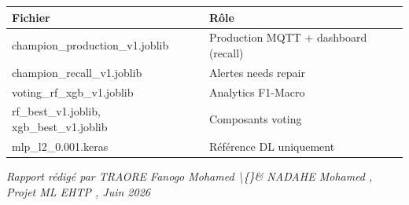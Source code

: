 \documentclass[11pt,a4paper]{report}
\begin{document}
{\small
\begin{longtable}{@{}>{\raggedright\arraybackslash}p{}>{\raggedright\arraybackslash}p{}@{}}
\toprule
\rowcolor{EHTPTableHead}Fichier & Rôle \\
\midrule
champion\_production\_v1.joblib & Production MQTT + dashboard (recall) \\
champion\_recall\_v1.joblib & Alertes needs repair \\
voting\_rf\_xgb\_v1.joblib & Analytics F1-Macro \\
rf\_best\_v1.joblib, xgb\_best\_v1.joblib & Composants voting \\
mlp\_l2\_0.001.keras & Référence DL uniquement \\
\bottomrule
\end{longtable}
}

\textit{Rapport rédigé par TRAORE Fanogo Mohamed \textbackslash\{\}\& NADAHE Mohamed ,  Projet ML EHTP ,  Juin 2026}
\end{document}
